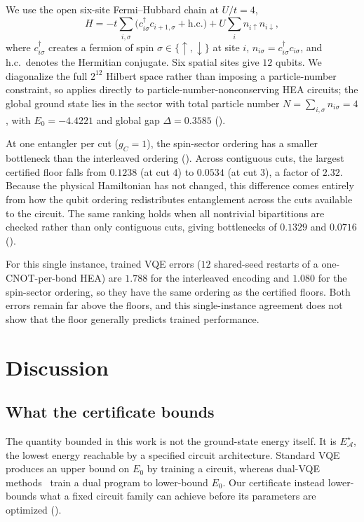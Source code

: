\documentclass[reprint,aps,pra,floatfix,superscriptaddress,nofootinbib,longbibliography]{revtex4-2}
\theoremstyle{remark}
\theoremstyle{definition}
\newcommand{\calA}{\mathcal{A}}
\newcommand{\Estar}{E_{\calA}^{\star}}
\begin{document}
We use the open six-site Fermi--Hubbard chain at $U/t=4$,
\begin{equation}
  H=-t\sum_{i,\sigma}\bigl(c^\dagger_{i\sigma}c_{i+1,\sigma}+\mathrm{h.c.}\bigr)
  +U\sum_i n_{i\uparrow}n_{i\downarrow},
\end{equation}
where $c^\dagger_{i\sigma}$ creates a fermion of spin
$\sigma\in\{\uparrow,\downarrow\}$ at site $i$,
$n_{i\sigma}=c^\dagger_{i\sigma}c_{i\sigma}$, and h.c.\ denotes the Hermitian
conjugate. Six spatial sites give $12$ qubits. We diagonalize the full $2^{12}$
Hilbert space rather than imposing a particle-number constraint, so
 applies directly to particle-number-nonconserving HEA circuits;
the global ground state lies in the sector with total particle number
$N=\sum_{i,\sigma}n_{i\sigma}=4$, with $E_0=-4.4221$ and global gap
$\Delta=0.3585$ ().

At one entangler per cut ($g_C=1$), the spin-sector ordering has a smaller
bottleneck than the interleaved ordering (). Across
contiguous cuts, the largest certified floor falls from $0.1238$ (at cut $4$) to
$0.0534$ (at cut $3$), a factor of $2.32$. Because the physical Hamiltonian has
not changed, this difference comes entirely from how the qubit ordering
redistributes entanglement across the cuts available to the circuit. The same
ranking holds when all nontrivial bipartitions are checked rather than only
contiguous cuts, giving bottlenecks of $0.1329$ and $0.0716$ ().

For this single instance, trained VQE errors ($12$ shared-seed restarts of a
one-CNOT-per-bond HEA) are $1.788$ for the interleaved encoding and $1.080$ for
the spin-sector ordering, so they have the same ordering as the certified
floors. Both errors remain far above the floors, and this single-instance
agreement does not show that the floor generally predicts trained performance.

\section{Discussion}
\label{sec:discussion}

\subsection{What the certificate bounds}

The quantity bounded in this work is not the ground-state energy itself. It is
$\Estar$, the lowest energy reachable by a specified circuit architecture.
Standard VQE produces an upper bound on $E_0$ by training a circuit, whereas
dual-VQE methods~\cite{westerheim2024dual} train a dual program to lower-bound
$E_0$. Our certificate instead lower-bounds what a fixed circuit family can
achieve before its parameters are optimized ().
\end{document}
